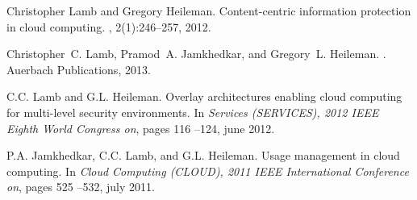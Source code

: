 \documentclass[margin,line]{resume}
\begin{document}
\begin{resume}
Christopher Lamb and Gregory Heileman.
\newblock Content-centric information protection in cloud computing.
,
  2(1):246--257, 2012.

Christopher~C. Lamb, Pramod~A. Jamkhedkar, and Gregory~L. Heileman.
.
\newblock Auerbach Publications, 2013.

C.C. Lamb and G.L. Heileman.
\newblock Overlay architectures enabling cloud computing for multi-level
  security environments.
\newblock In {\em Services (SERVICES), 2012 IEEE Eighth World Congress on},
  pages 116 --124, june 2012.



P.A. Jamkhedkar, C.C. Lamb, and G.L. Heileman.
\newblock Usage management in cloud computing.
\newblock In {\em Cloud Computing (CLOUD), 2011 IEEE International Conference
  on}, pages 525 --532, july 2011.

\end{resume}
\end{document}
